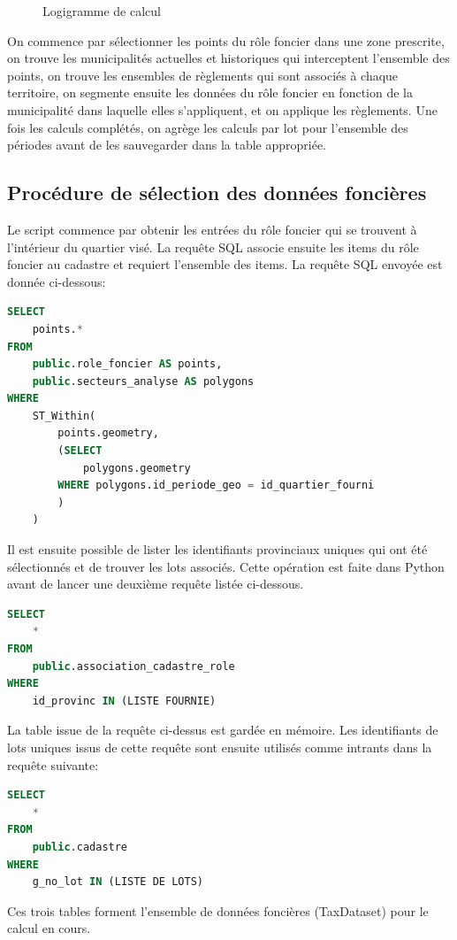 \begin{figure}[h]
            \caption{Logigramme de calcul}
            \label{fig:logigramme_calcul_urbanisme}
        \end{figure}
        On commence par sélectionner les points du rôle foncier dans une zone prescrite, on trouve les municipalités actuelles et historiques qui interceptent l'ensemble des points, on trouve les ensembles de règlements qui sont associés à chaque territoire, on segmente ensuite les données du rôle foncier en fonction de la municipalité dans laquelle elles s'appliquent, et on applique les règlements. Une fois les calculs complétés, on agrège les calculs par lot pour l'ensemble des périodes avant de les sauvegarder dans la table appropriée.
        \FloatBarrier
    \subsection{Procédure de sélection des données foncières} 
        Le script commence par obtenir les entrées du rôle foncier qui se trouvent à l'intérieur du quartier visé. La requête SQL associe ensuite les items du rôle foncier au cadastre et requiert l'ensemble des items. La requête SQL envoyée est donnée ci-dessous:
        \begin{lstlisting}[language=SQL, caption=Requête 1 dans tax\_database\_for\_analysis\_territory]
SELECT 
    points.* 
FROM 
    public.role_foncier AS points,
    public.secteurs_analyse AS polygons 
WHERE 
    ST_Within(
        points.geometry,
        (SELECT 
            polygons.geometry 
        WHERE polygons.id_periode_geo = id_quartier_fourni
        )
    )\end{lstlisting}
        Il est ensuite possible de lister les identifiants provinciaux uniques qui ont été sélectionnés et de trouver les lots associés. Cette opération est faite dans Python avant de lancer une deuxième requête listée ci-dessous.
        \begin{lstlisting}[language=SQL, caption=Requête 2 dans tax\_database\_for\_analysis\_territory]
SELECT 
    *
FROM
    public.association_cadastre_role
WHERE 
    id_provinc IN (LISTE FOURNIE)\end{lstlisting} \clearpage
        La table issue de la requête ci-dessus est gardée en mémoire. Les identifiants de lots uniques issus de cette requête sont ensuite utilisés comme intrants dans la requête suivante:
        \begin{lstlisting}[language=SQL, caption=Requête 3 dans tax\_database\_for\_analysis\_territory]
SELECT 
    * 
FROM 
    public.cadastre
WHERE 
    g_no_lot IN (LISTE DE LOTS)\end{lstlisting}
        Ces trois tables forment l'ensemble de données foncières (TaxDataset) pour le calcul en cours.
